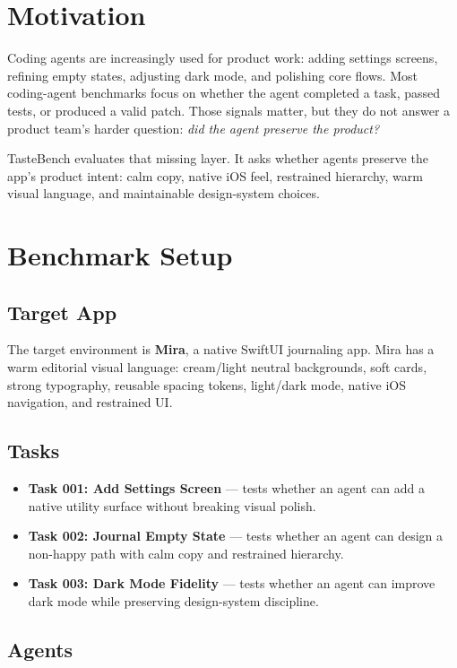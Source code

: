 \documentclass[11pt]{article}
\begin{document}
\section{Motivation}

Coding agents are increasingly used for product work: adding settings screens, refining empty states, adjusting dark mode, and polishing core flows. Most coding-agent benchmarks focus on whether the agent completed a task, passed tests, or produced a valid patch. Those signals matter, but they do not answer a product team's harder question: \emph{did the agent preserve the product?}

TasteBench evaluates that missing layer. It asks whether agents preserve the app's product intent: calm copy, native iOS feel, restrained hierarchy, warm visual language, and maintainable design-system choices.

\section{Benchmark Setup}

\subsection{Target App}

The target environment is \textbf{Mira}, a native SwiftUI journaling app. Mira has a warm editorial visual language: cream/light neutral backgrounds, soft cards, strong typography, reusable spacing tokens, light/dark mode, native iOS navigation, and restrained UI.

\subsection{Tasks}

\begin{itemize}
  \item \textbf{Task 001: Add Settings Screen} --- tests whether an agent can add a native utility surface without breaking visual polish.
  \item \textbf{Task 002: Journal Empty State} --- tests whether an agent can design a non-happy path with calm copy and restrained hierarchy.
  \item \textbf{Task 003: Dark Mode Fidelity} --- tests whether an agent can improve dark mode while preserving design-system discipline.
\end{itemize}

\subsection{Agents}
\end{document}
